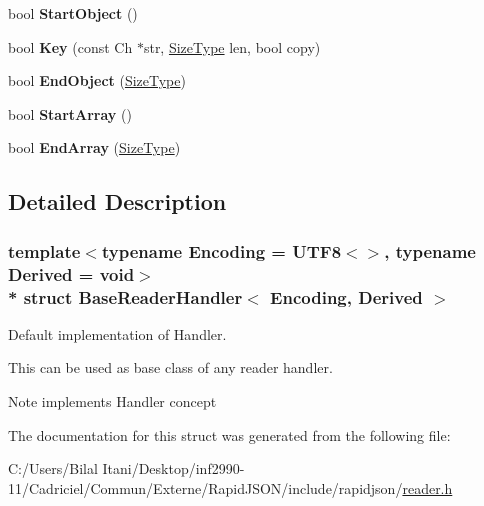 \begin{DoxyCompactItemize}
\item 
bool {\bfseries Start\+Object} ()\hypertarget{struct_base_reader_handler_ab0a7d9bcececb8d6ed748656f67f4917}{}\label{struct_base_reader_handler_ab0a7d9bcececb8d6ed748656f67f4917}

\item 
bool {\bfseries Key} (const Ch $\ast$str, \hyperlink{rapidjson_8h_a5ed6e6e67250fadbd041127e6386dcb5}{Size\+Type} len, bool copy)\hypertarget{struct_base_reader_handler_abc50b2e7e411b7b731715e05cd01e2eb}{}\label{struct_base_reader_handler_abc50b2e7e411b7b731715e05cd01e2eb}

\item 
bool {\bfseries End\+Object} (\hyperlink{rapidjson_8h_a5ed6e6e67250fadbd041127e6386dcb5}{Size\+Type})\hypertarget{struct_base_reader_handler_a0406cee0af26bc3a0b7fb2414537b0ab}{}\label{struct_base_reader_handler_a0406cee0af26bc3a0b7fb2414537b0ab}

\item 
bool {\bfseries Start\+Array} ()\hypertarget{struct_base_reader_handler_a9dbb1143a250a904bb18a174553a3a00}{}\label{struct_base_reader_handler_a9dbb1143a250a904bb18a174553a3a00}

\item 
bool {\bfseries End\+Array} (\hyperlink{rapidjson_8h_a5ed6e6e67250fadbd041127e6386dcb5}{Size\+Type})\hypertarget{struct_base_reader_handler_ae9d60a8779b6a77a7f283d64961879fb}{}\label{struct_base_reader_handler_ae9d60a8779b6a77a7f283d64961879fb}

\end{DoxyCompactItemize}


\subsection{Detailed Description}
\subsubsection*{template$<$typename Encoding = U\+T\+F8$<$$>$, typename Derived = void$>$\\*
struct Base\+Reader\+Handler$<$ Encoding, Derived $>$}

Default implementation of Handler. 

This can be used as base class of any reader handler. \begin{DoxyNote}{Note}
implements Handler concept 
\end{DoxyNote}


The documentation for this struct was generated from the following file\+:\begin{DoxyCompactItemize}
\item 
C\+:/\+Users/\+Bilal Itani/\+Desktop/inf2990-\/11/\+Cadriciel/\+Commun/\+Externe/\+Rapid\+J\+S\+O\+N/include/rapidjson/\hyperlink{reader_8h}{reader.\+h}\end{DoxyCompactItemize}
